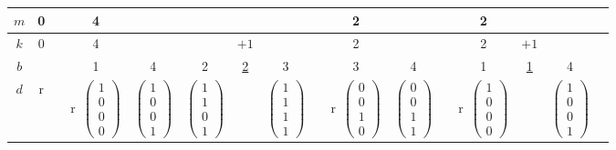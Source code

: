 \begin{table}[!t]
\centering
\begin{tabular}{|c|c@{}c|c@{}c@{}c@{}c@{}c@{}c|c@{}c@{}c|c@{}c@{}c@{}c|}
\hline
$m$ &0 & &4 & & & & & &2& &&2&&  &  \\ \hline
$k$ &0 & &4 & & &$+1$ & & &2& &&2&$+1$&  &  \\ \hline
$b$  &  & &1 &4&2&\underline{2}       &3& &3&4&&1&\underline{1}      &4&\\ \hline
$d$  &r  & &r~$\left(\begin{array}{c}1\\0\\0\\0\end{array}\right)$ & $\left(\begin{array}{c}1\\0\\0\\1\end{array}\right)$ & $\left(\begin{array}{c}1\\1\\0\\1\end{array}\right)$ & & $\left(\begin{array}{c}1\\1\\1\\1\end{array}\right)$ && r~$\left(\begin{array}{c}0\\0\\1\\0\end{array}\right)$ &$\left(\begin{array}{c}0\\0\\1\\1\end{array}\right)$ &&r~$\left(\begin{array}{c}1\\0\\0\\0\end{array}\right)$ & &$\left(\begin{array}{c}1\\0\\0\\1\end{array}\right)$  &  \\ \hline

\end{tabular}
\end{table}
